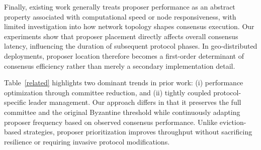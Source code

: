 Finally, existing work generally treats proposer performance as an abstract property associated with computational speed or node responsiveness, with limited investigation into how network topology shapes consensus execution. 
Our experiments show that proposer placement directly affects overall consensus latency, influencing the duration of subsequent protocol phases. 
In geo-distributed deployments, proposer location therefore becomes a first-order determinant of consensus efficiency rather than merely a secondary implementation detail.

Table~\ref{related} highlights two dominant trends in prior work: (i) performance optimization through committee reduction, and (ii) tightly coupled protocol-specific leader management. 
Our approach differs in that it preserves the full committee and the original Byzantine threshold while continuously adapting proposer frequency based on observed consensus performance. 
Unlike eviction-based strategies, proposer prioritization improves throughput without sacrificing resilience or requiring invasive protocol modifications.



%
%
